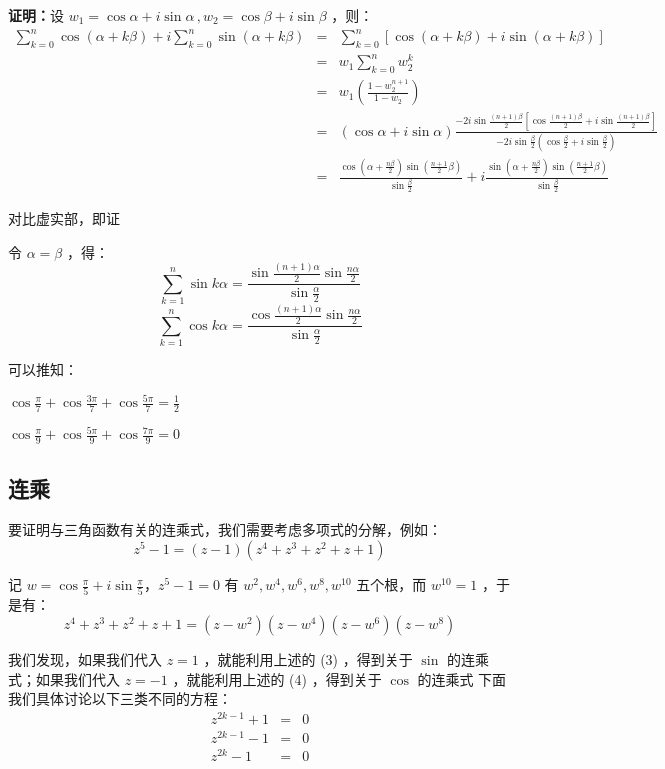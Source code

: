 \textbf{证明：}设 $w_1=\cos \alpha+i\sin\alpha\,,w_2=\cos \beta+i\sin\beta$ ，则：
$$\begin{eqnarray*} \sum_{k=0}^n\cos(\alpha+k\beta)+i\sum_{k=0}^n\sin(\alpha+k\beta)&=&\sum_{k=0}^n\left[\cos(\alpha+k\beta)+i\sin(\alpha+k\beta)\right]\\&=&w_1\sum_{k=0}^nw_2^k \\&=&w_1\left(\frac{1-w_2^{n+1}}{1-w_2}\right)\\ &=&(\cos \alpha+i\sin\alpha)\frac{-2i\sin{\frac{(n+1)\beta}2}\left[\cos{\frac{(n+1)\beta}2}+i\sin{\frac{(n+1)\beta}2}\right]}{-2i\sin{\frac{\beta}2}\left(\cos{\frac{\beta}2}+i\sin{\frac{\beta}2}\right)}\\ &=&\frac{\cos\left(\alpha+\frac{n\beta}2\right)\sin\left(\frac{n+1}2\beta\right)}{\sin\frac{\beta}2}+i\frac{\sin\left(\alpha+\frac{n\beta}2\right)\sin\left(\frac{n+1}2\beta\right)}{\sin\frac{\beta}2} \end{eqnarray*}$$

对比虚实部，即证

令 $\alpha=\beta$ ，得：
$$\sum_{k=1}^n\sin k\alpha=\frac{\sin{\frac{(n+1)\alpha}2}\sin{\frac{n\alpha}{2}}}{\sin{\frac{\alpha}2}}$$ $$\sum_{k=1}^n\cos k\alpha=\frac{\cos{\frac{(n+1)\alpha}2}\sin{\frac{n\alpha}{2}}}{\sin{\frac{\alpha}2}}$$ 

可以推知：

$\displaystyle{\cos\frac{\pi}{7}+\cos\frac{3\pi}{7}+\cos\frac{5\pi}{7}=\frac{1}{2}}$

$\displaystyle{\cos\frac{\pi}{9}+\cos\frac{5\pi}{9}+\cos\frac{7\pi}{9}=0}$

\subsection{连乘}
要证明与三角函数有关的连乘式，我们需要考虑多项式的分解，例如：
$$z^5-1=(z-1)(z^4+z^3+z^2+z+1)$$

记 $\displaystyle{w=\cos\frac{\pi}5+i\sin\frac{\pi}5}$，$z^5-1=0$ 有 $w^2,w^4,w^6,w^8,w^{10}$ 五个根，而 $w^{10}=1$ ，于是有：
$$z^4+z^3+z^2+z+1=(z-w^2)(z-w^4)(z-w^6)(z-w^8)$$

我们发现，如果我们代入 $z=1$ ，就能利用上述的 (3) ，得到关于 $\sin$ 的连乘式；如果我们代入 $z=-1$ ，就能利用上述的 (4) ，得到关于 $\cos$ 的连乘式
下面我们具体讨论以下三类不同的方程：
$$\begin{eqnarray*} z^{2k-1}+1&=&0\\z^{2k-1}-1&=&0 \\z^{2k}-1&=&0\end{eqnarray*}$$

